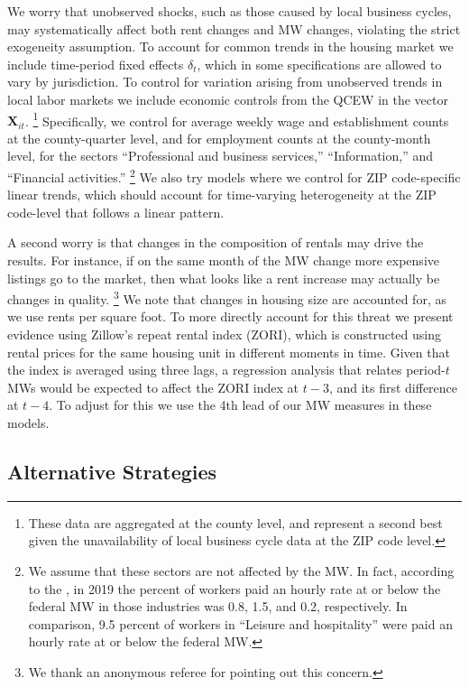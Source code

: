 We worry that unobserved shocks, such as those caused by local business cycles, 
may systematically affect both rent changes and MW changes, violating the 
strict exogeneity assumption.
To account for common trends in the housing market we include time-period 
fixed effects $\delta_t$, which in some specifications are allowed to vary by 
jurisdiction.
To control for variation arising from unobserved trends in local labor markets 
we include economic controls from the QCEW in the vector $\mathbf{X}_{it}$.%
\footnote{These data are aggregated at the county level, and represent a second 
    best given the unavailability of local business cycle data at the ZIP code 
    level.}
Specifically, we control for average weekly wage and establishment counts at the 
county-quarter level, and for employment counts at the county-month level, 
for the sectors ``Professional and business services,'' ``Information,'' and 
``Financial activities.''%
\footnote{We assume that these sectors are not affected by the MW.
    In fact, according to the \textcite[][Table 5]{MinWorkersReportBLS}, in 
    2019 the percent of workers paid an hourly rate at or below the federal MW 
    in those industries was 0.8, 1.5, and 0.2, respectively.
    In comparison, 9.5 percent of workers in ``Leisure and hospitality'' were 
    paid an hourly rate at or below the federal MW.}
We also try models where we control for ZIP code-specific linear
trends, which should account for time-varying heterogeneity at the ZIP 
code-level that follows a linear pattern.

A second worry is that changes in the composition of rentals may drive the 
results.
For instance, if on the same month of the MW change more expensive listings go
to the market, then what looks like a rent increase may actually be changes in 
quality.%
\footnote{We thank an anonymous referee for pointing out this concern.}
We note that changes in housing size are accounted for, as we use rents 
per square foot.
To more directly account for this threat we present evidence using Zillow's 
repeat rental index (ZORI), which is constructed using rental prices for the 
same housing unit in different moments in time.
Given that the index is averaged using three lags, a regression analysis
that relates period-$t$ MWs would be expected to affect the ZORI index
at $t-3$, and its first difference at $t-4$.
To adjust for this we use the 4th lead of our MW measures in these models.

\subsection{Alternative Strategies}\label{sec:alt_emp_strategies}


